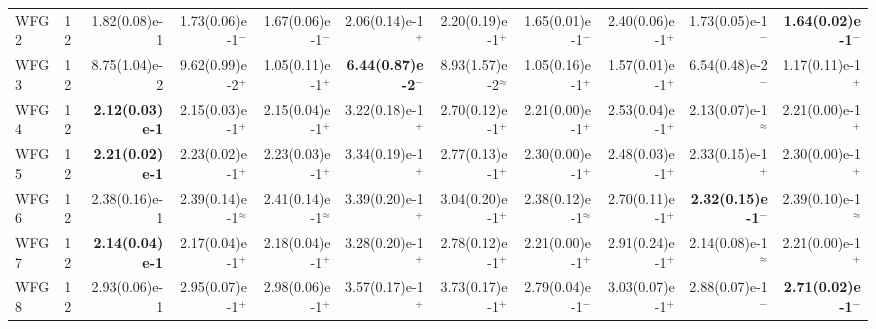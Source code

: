 \documentclass[pdflatex,sn-mathphys-ay]{sn-jnl}%
\theoremstyle{thmstyleone}%
\theoremstyle{thmstyletwo}%
\theoremstyle{thmstylethree}%
\begin{document}
\begin{landscape}
{\begin{longtable}{llrrrrrrrrr}
			WFG2                              & 12  & 1.82(0.08)e-1          & 1.73(0.06)e-1$^{-}$        & 1.67(0.06)e-1$^{-}$                & 2.06(0.14)e-1$^{+}$                & 2.20(0.19)e-1$^{+}$       & 1.65(0.01)e-1$^{-}$          & 2.40(0.06)e-1$^{+}$           & 1.73(0.05)e-1$^{-}$                & \textbf{1.64(0.02)e-1}$^{-}$ \\
			WFG3                              & 12  & 8.75(1.04)e-2          & 9.62(0.99)e-2$^{+}$        & 1.05(0.11)e-1$^{+}$                & \textbf{6.44(0.87)e-2}$^{-}$       & 8.93(1.57)e-2$^{\approx}$ & 1.05(0.16)e-1$^{+}$          & 1.57(0.01)e-1$^{+}$           & 6.54(0.48)e-2$^{-}$                & 1.17(0.11)e-1$^{+}$          \\
			WFG4                              & 12  & \textbf{2.12(0.03)e-1} & 2.15(0.03)e-1$^{+}$        & 2.15(0.04)e-1$^{+}$                & 3.22(0.18)e-1$^{+}$                & 2.70(0.12)e-1$^{+}$       & 2.21(0.00)e-1$^{+}$          & 2.53(0.04)e-1$^{+}$           & 2.13(0.07)e-1$^{\approx}$          & 2.21(0.00)e-1$^{+}$          \\
			WFG5                              & 12  & \textbf{2.21(0.02)e-1} & 2.23(0.02)e-1$^{+}$        & 2.23(0.03)e-1$^{+}$                & 3.34(0.19)e-1$^{+}$                & 2.77(0.13)e-1$^{+}$       & 2.30(0.00)e-1$^{+}$          & 2.48(0.03)e-1$^{+}$           & 2.33(0.15)e-1$^{+}$                & 2.30(0.00)e-1$^{+}$          \\
			WFG6                              & 12  & 2.38(0.16)e-1          & 2.39(0.14)e-1$^{\approx}$  & 2.41(0.14)e-1$^{\approx}$          & 3.39(0.20)e-1$^{+}$                & 3.04(0.20)e-1$^{+}$       & 2.38(0.12)e-1$^{\approx}$    & 2.70(0.11)e-1$^{+}$           & \textbf{2.32(0.15)e-1}$^{-}$       & 2.39(0.10)e-1$^{\approx}$    \\
			WFG7                              & 12  & \textbf{2.14(0.04)e-1} & 2.17(0.04)e-1$^{+}$        & 2.18(0.04)e-1$^{+}$                & 3.28(0.20)e-1$^{+}$                & 2.78(0.12)e-1$^{+}$       & 2.21(0.00)e-1$^{+}$          & 2.91(0.24)e-1$^{+}$           & 2.14(0.08)e-1$^{\approx}$          & 2.21(0.00)e-1$^{+}$          \\
			WFG8                              & 12  & 2.93(0.06)e-1          & 2.95(0.07)e-1$^{+}$        & 2.98(0.06)e-1$^{+}$                & 3.57(0.17)e-1$^{+}$                & 3.73(0.17)e-1$^{+}$       & 2.79(0.04)e-1$^{-}$          & 3.03(0.07)e-1$^{+}$           & 2.88(0.07)e-1$^{-}$                & \textbf{2.71(0.02)e-1}$^{-}$ \\

\end{longtable}}
\end{landscape}
\end{document}
